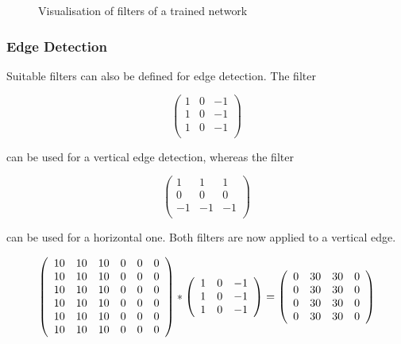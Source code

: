 {\begin{figure}[!h]
  \caption{Visualisation of filters of a trained network \cite{Lu:2019,Shang:2016}}\label{concept:FilterVis}
\end{figure}


\subsubsection{Edge Detection}

Suitable filters can also be defined for edge detection. The filter


$$\left(
\begin{array}{ccc}
    1 & 0 & -1 \\
    1 & 0 & -1 \\
    1 & 0 & -1 \\
\end{array}
\right)
$$

can be used for a vertical edge detection, whereas the filter 


$$\left(
\begin{array}{ccc}
    1 &  1 &  1 \\
    0 &  0 &  0 \\
    -1 & -1 & -1 \\
\end{array}
\right)
$$

can be used for a horizontal one. Both filters are now applied to a vertical edge.


\begin{figure}
$$
\left(
\begin{array}{ccc ccc}
    10 & 10 & 10 & 0 & 0 & 0 \\
    10 & 10 & 10 & 0 & 0 & 0 \\
    10 & 10 & 10 & 0 & 0 & 0 \\
    10 & 10 & 10 & 0 & 0 & 0 \\
    10 & 10 & 10 & 0 & 0 & 0 \\
    10 & 10 & 10 & 0 & 0 & 0 \\
\end{array}
\right)
\ast
\left(
\begin{array}{ccc}
    1 & 0 & -1 \\
    1 & 0 & -1 \\
    1 & 0 & -1 \\
\end{array}
\right)
=
\left(
\begin{array}{cccc}
    0 & 30 & 30 & 0 \\
    0 & 30 & 30 & 0 \\
    0 & 30 & 30 & 0 \\
    0 & 30 & 30 & 0 \\
\end{array}
\right)
$$


\end{figure}}
